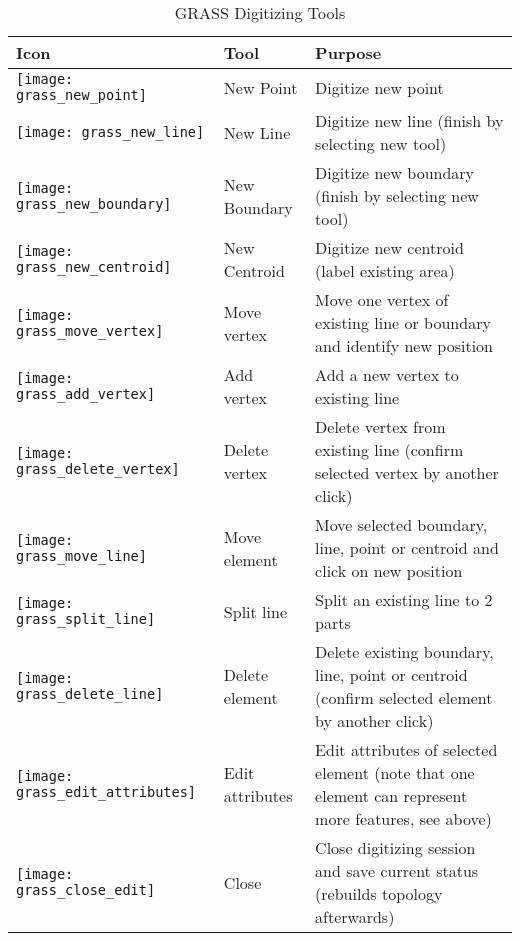 \begin{table}[h]
\centering
\caption{GRASS Digitizing Tools}\label{tab:grass_tools}\medskip
 \begin{tabular}{|l|l|p{5in}|}
 \hline \textbf{Icon} & \textbf{Tool} & \textbf{Purpose} \\
\hline \texttt{[image: grass\_new\_point]} & New Point & Digitize
new point \\
\hline \texttt{[image: grass\_new\_line]} & New Line & Digitize
new line (finish by selecting new tool) \\
\hline \texttt{[image: grass\_new\_boundary]} & New Boundary &
Digitize new boundary (finish by selecting new tool)\\
\hline \texttt{[image: grass\_new\_centroid]} & New Centroid &
Digitize new centroid (label existing area)\\
\hline \texttt{[image: grass\_move\_vertex]} & Move vertex & Move
one vertex of existing line or boundary and identify new position\\
\hline \texttt{[image: grass\_add\_vertex]} & Add vertex & Add a
new vertex to existing line\\
\hline \texttt{[image: grass\_delete\_vertex]} & Delete vertex &
Delete vertex from existing line (confirm selected vertex by another click)\\
\hline \texttt{[image: grass\_move\_line]} & Move element & Move
selected boundary, line, point or centroid and click on new position\\
\hline \texttt{[image: grass\_split\_line]} & Split line & Split
an existing line to 2 parts\\
\hline \texttt{[image: grass\_delete\_line]} & Delete element &
Delete existing boundary, line, point or centroid (confirm selected element by
another click)\\
\hline \texttt{[image: grass\_edit\_attributes]} & Edit attributes
& Edit attributes of selected element (note that one element can represent
more features, see above)\\
\hline \texttt{[image: grass\_close\_edit]} & Close & Close
digitizing session and save current status (rebuilds topology afterwards)\\
\hline
\end{tabular}
\end{table}


